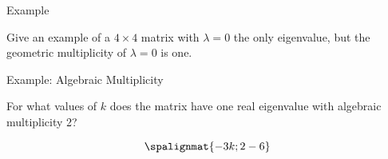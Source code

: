 \begin{frame}{Example}

    Give an example of a $4\times 4$ matrix with $\lambda =0$ the only eigenvalue, but the geometric multiplicity of $\lambda=0$ is one. 

\end{frame}

\begin{frame}{Example: Algebraic Multiplicity}

    For what values of $k$ does the matrix have one real eigenvalue with algebraic multiplicity 2? 
    
    $$\spalignmat{-3 k; 2 -6}$$

\end{frame}












